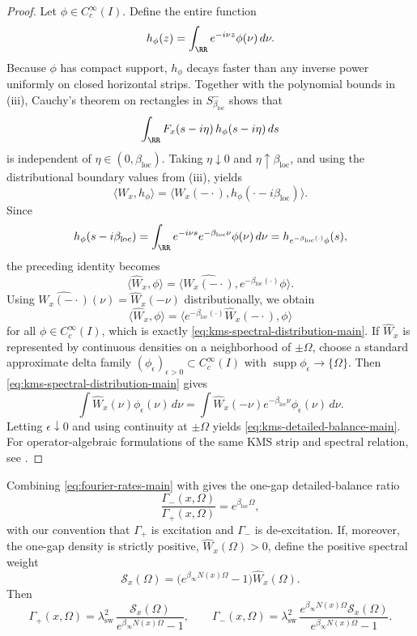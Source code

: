 \begin{proof}
Let $\phi\in C_c^\infty(I)$. Define the entire function
\[
h_\phi(z)=\int_{\RR}e^{-i\nu z}\phi(\nu)\,d\nu.
\]
Because $\phi$ has compact support, $h_\phi$ decays faster than any inverse power uniformly on closed horizontal strips. Together with the polynomial bounds in (iii), Cauchy's theorem on rectangles in $S_{\beta_{\mathrm{loc}}}^-$ shows that
\[
\int_{\RR}F_x(s-i\eta)\,h_\phi(s-i\eta)\,ds
\]
is independent of $\eta\in(0,\beta_{\mathrm{loc}})$. Taking $\eta\downarrow0$ and $\eta\uparrow\beta_{\mathrm{loc}}$, and using the distributional boundary values from (iii), yields
\[
\langle W_x,h_\phi\rangle
=
\langle W_x(-\cdot),h_\phi(\cdot-i\beta_{\mathrm{loc}})\rangle.
\]
Since
\[
h_\phi(s-i\beta_{\mathrm{loc}})
=\int_{\RR}e^{-i\nu s}e^{-\beta_{\mathrm{loc}}\nu}\phi(\nu)\,d\nu
=h_{e^{-\beta_{\mathrm{loc}}(\cdot)}\phi}(s),
\]
the preceding identity becomes
\[
\langle \widehat W_x,\phi\rangle
=
\langle \widehat{W_x(-\cdot)},e^{-\beta_{\mathrm{loc}}(\cdot)}\phi\rangle.
\]
Using $\widehat{W_x(-\cdot)}(\nu)=\widehat W_x(-\nu)$ distributionally, we obtain
\[
\langle \widehat W_x,\phi\rangle
=
\langle e^{-\beta_{\mathrm{loc}}(\cdot)}\widehat W_x(-\cdot),\phi\rangle
\]
for all $\phi\in C_c^\infty(I)$, which is exactly
\eqref{eq:kms-spectral-distribution-main}. If $\widehat W_x$ is represented by
continuous densities on a neighborhood of $\pm\Omega$, choose a standard
approximate delta family $(\phi_\epsilon)_{\epsilon>0}\subset C_c^\infty(I)$
with $\operatorname{supp}\phi_\epsilon\to\{\Omega\}$. Then
\eqref{eq:kms-spectral-distribution-main} gives
\[
\int \widehat W_x(\nu)\phi_\epsilon(\nu)\,d\nu
=
\int \widehat W_x(-\nu)e^{-\beta_{\mathrm{loc}}\nu}\phi_\epsilon(\nu)\,d\nu.
\]
Letting $\epsilon\downarrow0$ and using continuity at $\pm\Omega$ yields
\eqref{eq:kms-detailed-balance-main}. For operator-algebraic formulations of
the same KMS strip and spectral relation, see
\cite{HaagHugenholtzWinnink1967,KayWald1991,BratteliRobinson1997}.
\end{proof}

Combining \eqref{eq:fourier-rates-main} with
 gives the one-gap detailed-balance ratio
\[
\frac{\Gamma_-(x,\Omega)}{\Gamma_+(x,\Omega)}
=e^{\beta_{\mathrm{loc}}\Omega},
\]
with our convention that $\Gamma_+$ is excitation and $\Gamma_-$ is
de-excitation. If, moreover, the one-gap density is strictly positive,
$\widehat W_x(\Omega)>0$, define the positive spectral weight
\begin{equation}\label{eq:spectral-weight-def-main}
\mathcal S_x(\Omega)=
\bigl(e^{\beta_\infty N(x)\Omega}-1\bigr)\widehat W_x(\Omega).
\end{equation}
Then
\begin{equation}\label{eq:kms-rate-main}
\Gamma_+(x,\Omega)=
\lambda_{\mathrm{sw}}^2\,
\frac{\mathcal S_x(\Omega)}{e^{\beta_\infty N(x)\Omega}-1},
\qquad
\Gamma_-(x,\Omega)=
\lambda_{\mathrm{sw}}^2\,
\frac{e^{\beta_\infty N(x)\Omega}\mathcal S_x(\Omega)}
{e^{\beta_\infty N(x)\Omega}-1}.
\end{equation}

